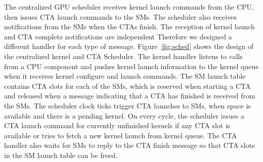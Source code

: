The centralized GPU scheduler receives kernel launch commands from the CPU, then
issues CTA launch commands to the SMs. The scheduler also receives notifications
from the SMs when the CTAs finish. The reception of kernel launch and CTA
complete notifications are independent Therefore we designed a different
handler for each type of message. Figure~\ref{fig:sched} shows the design of the
centralized kernel and CTA Scheduler. The kernel handler listens to calls from a
CPU component and pushes kernel launch information to the kernel queue when it
receives kernel configure and launch commands. The SM launch table contains CTA
slots for each of the SMs, which is reserved when starting a CTA and released when a
message indicating that a CTA has finished is received from the SMs. The
scheduler clock ticks trigger CTA launches to SMs, when space is available and
there is a pending kernel. On every cycle, the scheduler issues a CTA launch
command for currently unfinished kernels if any CTA slot is available or tries
to fetch a new kernel launch from kernel queue. The CTA handler also waits for
SMs to reply to the CTA finish message so that CTA slots in the SM launch table can
be freed.
